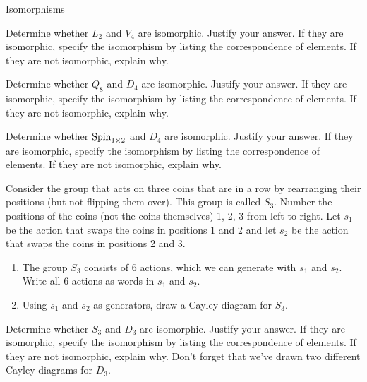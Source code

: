 \begin{section}{Isomorphisms}
\begin{problem}
Determine whether $L_2$ and $V_4$ are isomorphic.  Justify your answer.  If they are isomorphic, specify the isomorphism by listing the correspondence of elements. If they are not isomorphic, explain why.
\end{problem}

\begin{problem}
Determine whether $Q_8$ and $D_4$ are isomorphic.  Justify your answer.  If they are isomorphic, specify the isomorphism by listing the correspondence of elements. If they are not isomorphic, explain why.
\end{problem}

\begin{problem}
Determine whether $\operatorname{Spin}_{1\times 2}$ and $D_4$ are isomorphic.  Justify your answer.  If they are isomorphic, specify the isomorphism by listing the correspondence of elements. If they are not isomorphic, explain why.
\end{problem}

\begin{exercise}\label{exer:S_3}
Consider the group that acts on three coins that are in a row by rearranging their positions (but not flipping them over).  This group is called $S_3$.  Number the positions of the coins (not the coins themselves) 1, 2, 3 from left to right.  Let $s_1$ be the action that swaps the coins in positions 1 and 2 and let $s_2$ be the action that swaps the coins in positions 2 and 3.
\begin{enumerate}[label=\rm{(\alph*)}]
\item The group $S_3$ consists of 6 actions, which we can generate with $s_1$ and $s_2$.  Write all 6 actions as words in $s_1$ and $s_2$.
\item Using $s_1$ and $s_2$ as generators, draw a Cayley diagram for $S_3$.
\end{enumerate}
\end{exercise}

\begin{problem}\label{prob:D3_iso_S3}
Determine whether $S_3$ and $D_3$ are isomorphic.  Justify your answer.  If they are isomorphic, specify the isomorphism by listing the correspondence of elements.  If they are not isomorphic, explain why. Don't forget that we've drawn two different Cayley diagrams for $D_3$.
\end{problem}

\end{section}